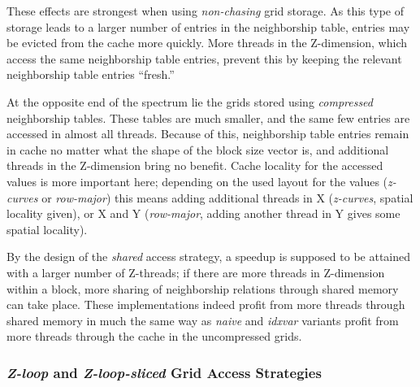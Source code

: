 These effects are strongest when using \emph{non-chasing} grid storage. As this type of storage leads to a larger number of entries in the neighborship table, entries may be evicted from the cache more quickly. More threads in the Z-dimension, which access the same neighborship table entries, prevent this by keeping the relevant neighborship table entries ``fresh.''

At the opposite end of the spectrum lie the grids stored using \emph{compressed} neighborship tables. These tables are much smaller, and the same few entries are accessed in almost all threads. Because of this, neighborship table entries remain in cache no matter what the shape of the block size vector is, and additional threads in the Z-dimension bring no benefit. Cache locality for the accessed values is more important here; depending on the used layout for the values (\emph{z-curves} or \emph{row-major}) this means adding additional threads in X (\emph{z-curves}, spatial locality given), or X and Y (\emph{row-major}, adding another thread in Y gives some spatial locality).

By the design of the \emph{shared} access strategy, a speedup is supposed to be attained with a larger number of Z-threads; if there are more threads in Z-dimension within a block, more sharing of neighborship relations through shared memory can take place. These implementations indeed profit from more threads through shared memory in much the same way as \emph{naive} and \emph{idxvar} variants profit from more threads through the cache in the uncompressed grids.

\subsubsection{\emph{Z-loop} and \emph{Z-loop-sliced} Grid Access Strategies}

